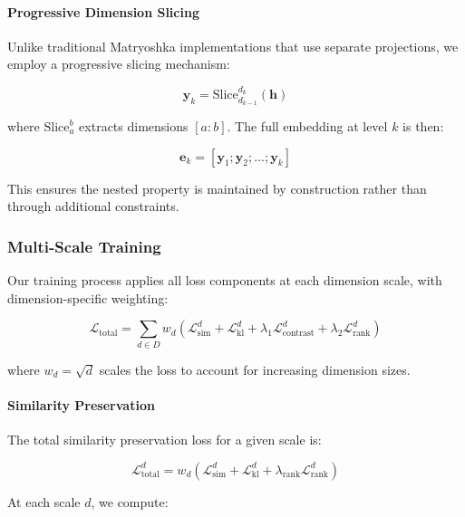 \paragraph{Progressive Dimension Slicing}
Unlike traditional Matryoshka implementations that use separate projections, we employ a progressive slicing mechanism:

\begin{equation}
    \mathbf{y}_k = \text{Slice}_{d_{k-1}}^{d_k}(\mathbf{h})
\end{equation}

where $\text{Slice}_{a}^{b}$ extracts dimensions $[a:b]$. The full embedding at level $k$ is then:

\begin{equation}
    \mathbf{e}_k = [\mathbf{y}_1; \mathbf{y}_2; ...; \mathbf{y}_k]
\end{equation}

This ensures the nested property is maintained by construction rather than through additional constraints.

\subsubsection{Multi-Scale Training}

Our training process applies all loss components at each dimension scale, with dimension-specific weighting:

\begin{equation}
    \mathcal{L}_{\text{total}} = \sum_{d \in D} w_d(\mathcal{L}_{\text{sim}}^d + \mathcal{L}_{\text{kl}}^d + \lambda_1\mathcal{L}_{\text{contrast}}^d + \lambda_2\mathcal{L}_{\text{rank}}^d)
\end{equation}

where $w_d = \sqrt{d}$ scales the loss to account for increasing dimension sizes.

\paragraph{Similarity Preservation}
The total similarity preservation loss for a given scale is:

\begin{equation}
    \mathcal{L}_{\text{total}}^d = w_d(\mathcal{L}_{\text{sim}}^d + \mathcal{L}_{\text{kl}}^d + \lambda_{\text{rank}}\mathcal{L}_{\text{rank}}^d)
\end{equation}

At each scale $d$, we compute:

